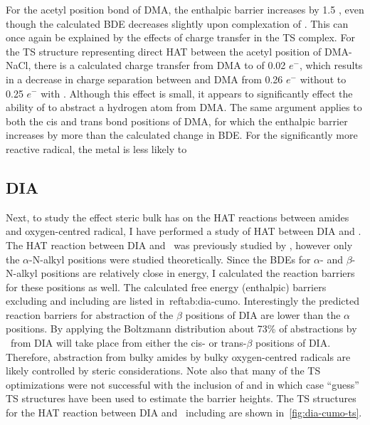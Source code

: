 For the acetyl position  bond of DMA, the enthalpic barrier increases by 1.5 \kcalmol, even though the calculated BDE decreases slightly upon complexation of . This can once again be explained by the effects of charge transfer in the TS complex. For the TS structure representing direct HAT between  the acetyl position of DMA-NaCl, there is a calculated charge transfer from DMA to  of 0.02 $e^-$, which results in a decrease in charge separation between  and DMA from 0.26 $e^-$ without  to 0.25 $e^-$ with . Although this effect is small, it appears to significantly effect the ability of  to abstract a hydrogen atom from DMA. The same argument applies to both the cis and trans  bond positions of DMA, for which the enthalpic barrier increases by more than the calculated change in BDE. For the significantly more reactive  radical, the metal is less likely to

\subsection{DIA}

Next, to study the effect steric bulk has on the HAT reactions between amides and oxygen-centred radical, I have performed a study of HAT between DIA and \cumo. The HAT reaction between DIA and \cumo\ was previously studied by \citet{Salamone2014}, however only the $\alpha$-N-alkyl positions were studied theoretically. Since the BDEs for $\alpha$- and $\beta$-N-alkyl  positions are relatively close in energy, I calculated the reaction barriers for these positions as well. The calculated free energy (enthalpic) barriers excluding and including  are listed in~ref{tab:dia-cumo}. Interestingly the predicted reaction barriers for abstraction of the $\beta$ positions of DIA are lower than the $\alpha$ positions. By applying the Boltzmann distribution about 73\% of abstractions by \cumo\ from DIA will take place from either the cis- or trans-$\beta$ positions of DIA.  Therefore, abstraction from bulky amides by bulky oxygen-centred radicals are likely controlled by steric considerations. Note also that many of the TS optimizations were not successful with the inclusion of  and in which case ``guess'' TS structures have been used to estimate the barrier heights. The TS structures for the HAT reaction between DIA and \cumo\ including  are shown in~\ref{fig:dia-cumo-ts}.

